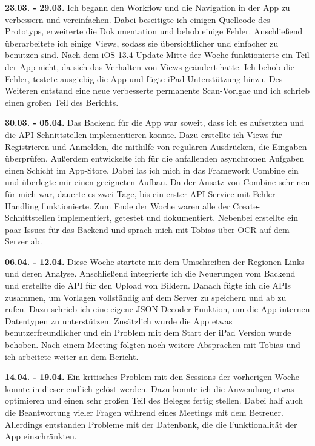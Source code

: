 \documentclass[notables, nomenclature, oneside, 150]{HSMW-Thesis}
\begin{document}
	\textbf{23.03. - 29.03.} 
	Ich begann den Workflow und die Navigation in der App zu verbessern und vereinfachen. Dabei beseitigte ich einigen Quellcode des Prototyps, erweiterte die Dokumentation und behob einige Fehler. Anschließend überarbeitete ich einige Views, sodass sie übersichtlicher und einfacher zu benutzen sind. Nach dem iOS 13.4 Update Mitte der Woche funktionierte ein Teil der App nicht, da sich das Verhalten von Views geändert hatte. Ich behob die Fehler, testete ausgiebig die App und fügte iPad Unterstützung hinzu. Des Weiteren entstand eine neue verbesserte permanente Scan-Vorlgae und ich schrieb einen großen Teil des Berichts.
	
	\textbf{30.03. - 05.04.} 
	Das Backend für die App war soweit, dass ich es aufsetzten und die API-Schnittstellen implementieren konnte. Dazu erstellte ich Views für Registrieren und Anmelden, die mithilfe von regulären Ausdrücken, die Eingaben überprüfen. Außerdem entwickelte ich für die anfallenden asynchronen Aufgaben einen Schicht im App-Store. Dabei las ich mich in das Framework Combine ein und überlegte mir einen geeigneten Aufbau. Da der Ansatz von Combine sehr neu für mich war, dauerte es zwei Tage, bis ein erster API-Service mit Fehler-Handling funktionierte. Zum Ende der Woche waren alle der Create-Schnittstellen implementiert, getestet und dokumentiert. Nebenbei erstellte ein paar Issues für das Backend und sprach mich mit Tobias über OCR auf dem Server ab.
	
	\textbf{06.04. - 12.04.}
	Diese Woche startete mit dem Umschreiben der Regionen-Links und deren Analyse. Anschließend integrierte ich die Neuerungen vom Backend und erstellte die API für den Upload von Bildern. Danach fügte ich die APIs zusammen, um Vorlagen vollständig auf dem Server zu speichern und ab zu rufen. Dazu schrieb ich eine eigene JSON-Decoder-Funktion, um die App internen Datentypen zu unterstützen. Zusätzlich wurde die App etwas benutzerfreundlicher und ein Problem mit dem Start der iPad Version wurde behoben. Nach einem Meeting folgten noch weitere Absprachen mit Tobias und ich arbeitete weiter an dem Bericht.
	
	\textbf{14.04. - 19.04.}
	Ein kritisches Problem mit den Sessions der vorherigen Woche konnte in dieser endlich gelöst werden. Dazu konnte ich die Anwendung etwas optimieren und einen sehr großen Teil des Beleges fertig stellen. Dabei half auch die Beantwortung vieler Fragen während eines Meetings mit dem Betreuer. Allerdings entstanden Probleme mit der Datenbank, die die Funktionalität der App einschränkten.
	
\end{document}
